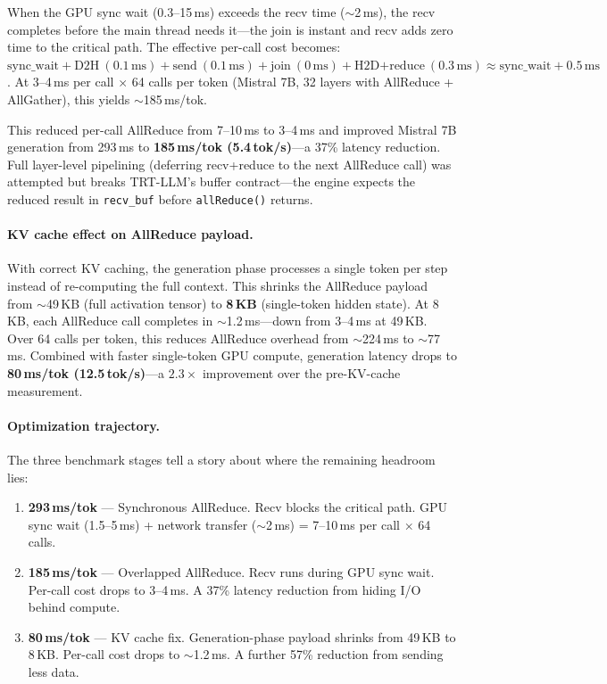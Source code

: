 \documentclass[10pt,twocolumn]{article}
\begin{document}
When the GPU sync wait (0.3--15\,ms) exceeds the recv time ($\sim$2\,ms),
the recv completes before the main thread needs it---the join is instant
and recv adds zero time to the critical path.  The effective per-call cost
becomes: $\text{sync\_wait} + \text{D2H}~(0.1\,\text{ms}) +
\text{send}~(0.1\,\text{ms}) + \text{join}~(0\,\text{ms}) +
\text{H2D+reduce}~(0.3\,\text{ms}) \approx \text{sync\_wait} +
0.5\,\text{ms}$.  At 3--4\,ms per call $\times$ 64 calls per token
(Mistral 7B, 32 layers with AllReduce + AllGather), this yields
$\sim$185\,ms/tok.

This reduced per-call AllReduce from 7--10\,ms to 3--4\,ms and improved
Mistral 7B generation from 293\,ms to \textbf{185\,ms/tok (5.4\,tok/s)}---a
37\% latency reduction.  Full layer-level pipelining (deferring
recv+reduce to the next AllReduce call) was attempted but breaks TRT-LLM's
buffer contract---the engine expects the reduced result in
\texttt{recv\_buf} before \texttt{allReduce()} returns.

\paragraph{KV cache effect on AllReduce payload.}
With correct KV caching, the generation phase processes a single token per
step instead of re-computing the full context.  This shrinks the AllReduce
payload from $\sim$49\,KB (full activation tensor) to \textbf{8\,KB}
(single-token hidden state).  At 8\,KB, each AllReduce call completes in
$\sim$1.2\,ms---down from 3--4\,ms at 49\,KB\@.  Over 64 calls per token,
this reduces AllReduce overhead from $\sim$224\,ms to $\sim$77\,ms.
Combined with faster single-token GPU compute, generation latency drops to
\textbf{80\,ms/tok (12.5\,tok/s)}---a $2.3\times$ improvement over the
pre-KV-cache measurement.

\paragraph{Optimization trajectory.}
The three benchmark stages tell a story about where the remaining headroom
lies:

\begin{enumerate}[nosep,leftmargin=*]
  \item \textbf{293\,ms/tok} --- Synchronous AllReduce.  Recv blocks the
    critical path.  GPU sync wait (1.5--5\,ms) + network transfer
    ($\sim$2\,ms) = 7--10\,ms per call $\times$ 64 calls.
  \item \textbf{185\,ms/tok} --- Overlapped AllReduce.  Recv runs during
    GPU sync wait.  Per-call cost drops to 3--4\,ms.  A 37\% latency
    reduction from hiding I/O behind compute.
  \item \textbf{80\,ms/tok} --- KV cache fix.  Generation-phase payload
    shrinks from 49\,KB to 8\,KB\@.  Per-call cost drops to $\sim$1.2\,ms.
    A further 57\% reduction from sending less data.
\end{enumerate}
\end{document}
